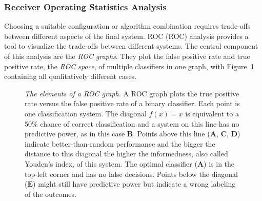 \subsubsection*{Receiver Operating Statistics Analysis}

Choosing a suitable configuration or algorithm combination requires trade-offs between different aspects of the final system.
\acrlong{ROC} (\acrshort{ROC}) analysis\cite{fawcett_2006} provides a tool to visualize the trade-offs between different systems.
The central component of this analysis are the \emph{\acrshort{ROC} graphs}.
They plot the false positive rate and true positive rate, the \emph{\acrshort{ROC} space}, of multiple classifiers in one graph, with Figure~\ref{fig:roc_graph} containing all qualitatively different cases.
\begin{figure}[H]
\caption[The elements of a \acrshort{ROC} graph]{\emph{The elements of a \acrshort{ROC} graph.} A \acrshort{ROC} graph plots the true positive rate versus the false positive rate of a binary classifier. Each point is one classification system. The diagonal $f(x) = x$ is equivalent to a 50\% chance of correct classification and a system on this line has no predictive power, as in this case $\mathbf{B}$. Points above this line ($\mathbf{A}$, $\mathbf{C}$, $\mathbf{D}$) indicate better-than-random performance and the bigger the distance to this diagonal the higher the informedness, also called Youden's index, of this system. The optimal classifier ($\mathbf{A}$) is in the top-left corner and has no false decisions. Points below the diagonal ($\mathbf{E}$) might still have predictive power but indicate a wrong labeling of the outcomes.}\label{fig:roc_graph}
\end{figure}

